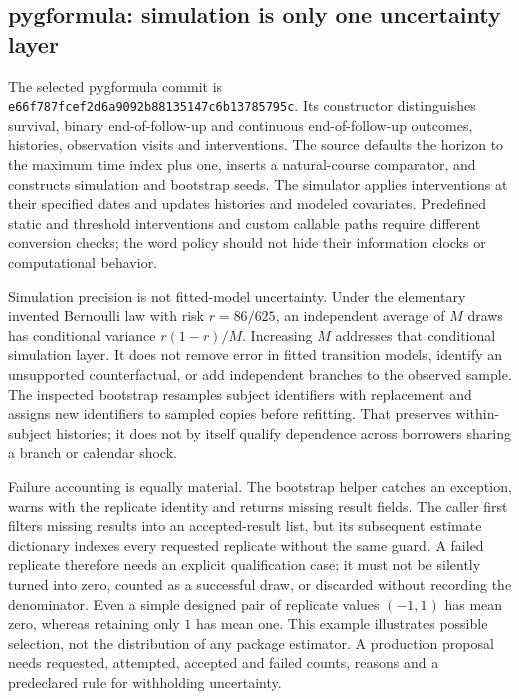 \subsection{pygformula: simulation is only one uncertainty layer}
The selected pygformula commit is
\texttt{e66f787fcef2d6a9092b88135147c6b13785795c}.
Its constructor distinguishes survival, binary end-of-follow-up and continuous
end-of-follow-up outcomes, histories, observation visits and interventions.
The source defaults the horizon to the maximum time index plus one, inserts
a natural-course comparator, and constructs simulation and bootstrap seeds.
The simulator applies interventions at their specified dates and updates
histories and modeled covariates. Predefined static and threshold interventions
and custom callable paths require different conversion checks; the word
policy should not hide their information clocks or computational behavior.
\citep{exec24_longpy_pygformula_source}

Simulation precision is not fitted-model uncertainty. Under the elementary
invented Bernoulli law with risk $r=86/625$, an independent average of $M$
draws has conditional variance $r(1-r)/M$. Increasing $M$ addresses that
conditional simulation layer. It does not remove error in fitted transition
models, identify an unsupported counterfactual, or add independent branches
to the observed sample. The inspected bootstrap resamples subject identifiers
with replacement and assigns new identifiers to sampled copies before
refitting. That preserves within-subject histories; it does not by itself
qualify dependence across borrowers sharing a branch or calendar shock.
\citep{exec24_longpy_reference,exec24_longpy_pygformula_source}

Failure accounting is equally material. The bootstrap helper catches an
exception, warns with the replicate identity and returns missing result
fields. The caller first filters missing results into an accepted-result list,
but its subsequent estimate dictionary indexes every requested replicate
without the same guard. A failed replicate therefore needs an explicit
qualification case; it must not be silently turned into zero, counted as a
successful draw, or discarded without recording the denominator. Even a
simple designed pair of replicate values $(-1,1)$ has mean zero, whereas
retaining only $1$ has mean one. This example illustrates possible selection,
not the distribution of any package estimator. A production proposal needs
requested, attempted, accepted and failed counts, reasons and a predeclared
rule for withholding uncertainty.\citep{exec24_longpy_pygformula_source,exec24_longpy_reference}

